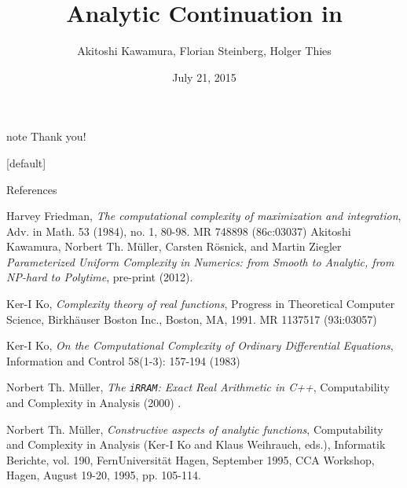 \documentclass[xcolor=pdftex,dvipsnames,table]{beamer}
\title[Analytic Continuation in iRRAM]{Analytic Continuation in \irram}
\author[A. Kawamura, F. Steinberg, H. Thies]{
		Akitoshi Kawamura, Florian Steinberg, Holger Thies 
}
\institute[JAIST]{
	Japan Institute of Science and Technology, Ishikawa Prefecture
}
\newcommand{\irram}{\texttt{iRRAM}\xspace}
\begin{document}
\date{July 21, 2015}
\frame{
\titlepage
}




\begin{frame}

    \vspace{\fill}
\begin{beamercolorbox}[center,shadow=true,rounded=true]{note} 
        \huge Thank you!
\end{beamercolorbox}

    \vspace{\fill}
\end{frame} 
{
\makeatletter %
    [default] 
    \def\beamer@entrycode{\vspace*{-\headheight}} 
\makeatother
\begin{frame}{References}
\fontsize{6pt}{7.2}\selectfont 
\nocite{*}
\def\newblock{}


\begin{thebibliography}{10}   

  \beamertemplatearticlebibitems
	Harvey Friedman,
    \newblock \emph{ The computational complexity of maximization and integration}, Adv. in Math. 53 (1984), no. 1, 80-98. MR 748898 (86c:03037)
  \beamertemplatearticlebibitems
	Akitoshi Kawamura, Norbert Th. M\"{u}ller, Carsten R\"{o}snick, and
Martin Ziegler
    \newblock \emph{Parameterized Uniform Complexity in Numerics:
from Smooth to Analytic, from NP-hard to Polytime}, pre-print (2012).

  \beamertemplatearticlebibitems
	Ker-I Ko,
    \newblock \emph{ Complexity theory of real functions}, Progress in Theoretical Computer Science, Birkh\"{a}user Boston Inc., Boston, MA, 1991.
MR 1137517 (93i:03057)

  \beamertemplatearticlebibitems
	Ker-I Ko,
    \newblock \emph{  On the Computational Complexity of Ordinary Differential Equations}, Information and Control 58(1-3): 157-194 (1983)


  \beamertemplatearticlebibitems
	Norbert Th. M\"{u}ller,
    \newblock \emph{ The \irram: Exact Real Arithmetic in C++}, Computability and Complexity in Analysis (2000) .

  \beamertemplatearticlebibitems
	Norbert Th. M\"{u}ller,
    \newblock \emph{ Constructive aspects of analytic functions}, Computability
and Complexity in Analysis (Ker-I Ko and Klaus Weihrauch, eds.),
Informatik Berichte, vol. 190, FernUniversit\"{a}t Hagen, September
1995, CCA Workshop, Hagen, August 19-20, 1995, pp. 105-114.


\end{thebibliography}
\end{frame}}
\end{document}
